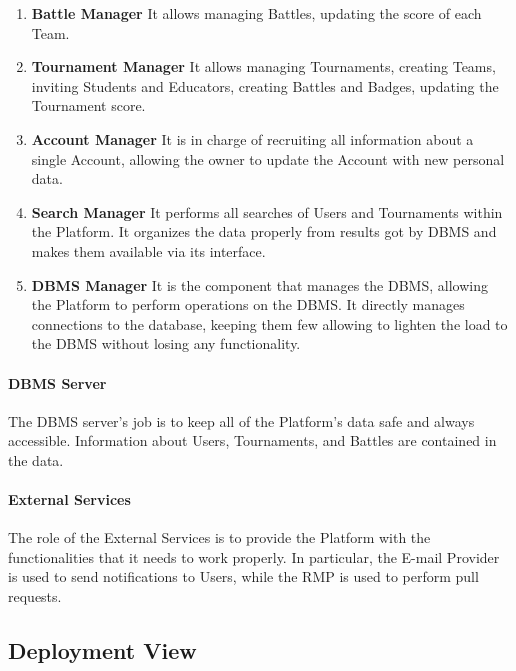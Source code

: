 \begin{enumerate}
    \item \textbf{Battle Manager} It allows managing Battles, updating the score of each Team.
    \item \textbf{Tournament Manager} It allows managing Tournaments, creating Teams, inviting Students and Educators, creating Battles and Badges, updating the Tournament score.
    \item \textbf{Account Manager} It is in charge of recruiting all information about a single Account, allowing the owner to update the Account with new personal data.
    \item \textbf{Search Manager} It performs all searches of Users and Tournaments within the Platform. It organizes the data properly from results got by DBMS and makes them available via its interface.
    \item \textbf{DBMS Manager} It is the component that manages the DBMS, allowing the Platform to perform operations on the DBMS. It directly manages connections to the database, keeping them few allowing to lighten the load to the DBMS without losing any functionality.
\end{enumerate}
\newpage
{}
\newpage
\paragraph{DBMS Server}
The DBMS server's job is to keep all of the Platform's data safe and always accessible. Information about Users, Tournaments, and Battles are contained in the data.

\paragraph{External Services}
The role of the External Services is to provide the Platform with the functionalities that it needs to work properly. In particular, the E-mail Provider is used to send notifications to Users, while the RMP is used to perform pull requests.            
\newpage

\subsection{Deployment View}

